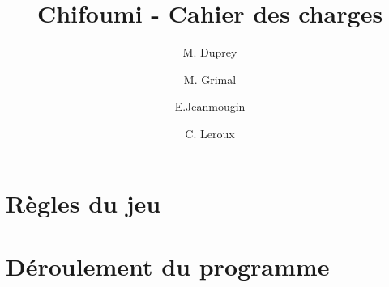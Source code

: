 \documentclass{article}
\begin{document}
 
\title{Chifoumi - Cahier des charges}
\author{M. Duprey \and M. Grimal \and E.Jeanmougin \and C. Leroux}
 
 
 \maketitle
 
 \newpage
 \tableofcontents
\newpage

\section{Règles du jeu}

\section{Déroulement du programme}
 
\end{document}
